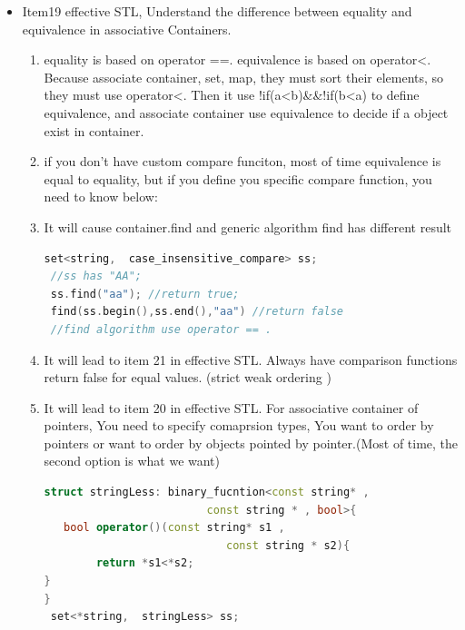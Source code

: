\documentclass[a4paper,12pt,twoside]{book}
\begin{document}
\begin{itemize}
\item Item19 effective STL, Understand the difference between equality and equivalence in associative Containers.
  \begin{enumerate}
  \item equality is based on operator ==. equivalence is based on operator<. Because associate container, set, map, they must sort their elements, so they must use operator<. Then it use !if(a<b)\&\&!if(b<a) to define equivalence, and associate container use equivalence to decide if a object exist in container.
  \item if you don't have custom compare funciton, most of time equivalence is equal to equality, but if you define you specific compare function, you need to know below:
  \item It will cause container.find and generic algorithm find has different result
\begin{lstlisting}[frame=single, language=c++]
 set<string,  case_insensitive_compare> ss;
 //ss has "AA";
 ss.find("aa"); //return true;
 find(ss.begin(),ss.end(),"aa") //return false
 //find algorithm use operator == .
\end{lstlisting}
  \item It will lead to item 21 in effective STL. Always have comparison functions return false for equal values. (strict weak ordering )
  \item It will lead to item 20 in effective STL. For associative container of pointers, You need to specify comaprsion types, You want to order by pointers or want to order by objects pointed by pointer.(Most of time, the second option is what we want)
\begin{lstlisting}[frame=single, language=c++]
struct stringLess: binary_fucntion<const string* ,
                         const string * , bool>{
   bool operator()(const string* s1 ,
                            const string * s2){
        return *s1<*s2;
}
}
 set<*string,  stringLess> ss;
\end{lstlisting}


  \end{enumerate}

\end{itemize}
\end{document}
